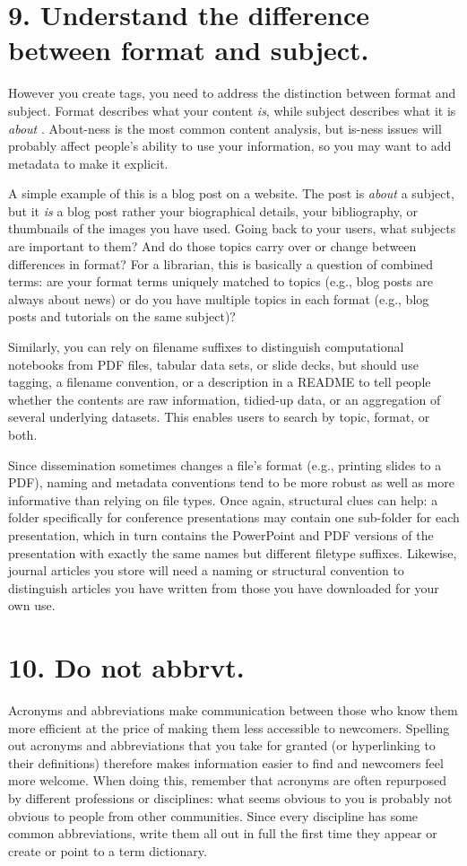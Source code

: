 \documentclass[10pt,letterpaper]{article}
\newcommand{\rulemajor}[1]{\section*{#1}}
\begin{document}
\rulemajor{9. Understand the difference between format and subject.}

However you create tags, you need to address the distinction between format and
subject. Format describes what your content \emph{is}, while subject describes
what it is \emph{about} \cite{Joudrey2015}. About-ness is the most common
content analysis, but is-ness issues will probably affect people's ability to
use your information, so you may want to add metadata to make it explicit.

A simple example of this is a blog post on a website. The post is \emph{about} a
subject, but it \emph{is} a blog post rather your biographical details, your
bibliography, or thumbnails of the images you have used.  Going back to your
users, what subjects are important to them? And do those topics carry over or
change between differences in format? For a librarian, this is basically a
question of combined terms: are your format terms uniquely matched to topics
(e.g., blog posts are always about news) or do you have multiple topics in each
format (e.g., blog posts and tutorials on the same subject)?

Similarly, you can rely on filename suffixes to distinguish computational
notebooks from PDF files, tabular data sets, or slide decks, but should use
tagging, a filename convention, or a description in a README to tell people
whether the contents are raw information, tidied-up data, or an aggregation of
several underlying datasets. This enables users to search by topic, format, or
both.

Since dissemination sometimes changes a file's format (e.g., printing slides to
a PDF), naming and metadata conventions tend to be more robust as well as more
informative than relying on file types. Once again, structural clues can help: a
folder specifically for conference presentations may contain one sub-folder for
each presentation, which in turn contains the PowerPoint and PDF versions of the
presentation with exactly the same names but different filetype suffixes.
Likewise, journal articles you store will need a naming or structural convention
to distinguish articles you have written from those you have downloaded for your
own use.

\rulemajor{10. Do not abbrvt.}

Acronyms and abbreviations make communication between those who know them more
efficient at the price of making them less accessible to newcomers. Spelling
out acronyms and abbreviations that you take for granted (or hyperlinking to
their definitions) therefore makes information easier to find and newcomers feel
more welcome. When doing this, remember that acronyms are often repurposed by
different professions or disciplines: what seems obvious to you is probably not
obvious to people from other communities. Since every discipline has some common
abbreviations, write them all out in full the first time they appear or create
or point to a term dictionary.
\end{document}
